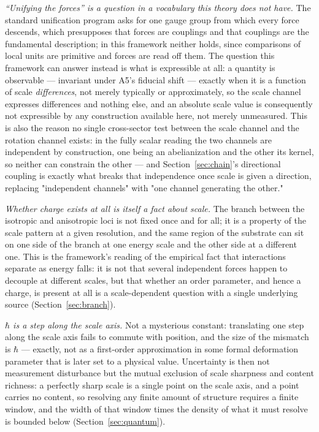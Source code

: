 \documentclass[aps,prd,twocolumn,superscriptaddress,nofootinbib]{revtex4-2}
\begin{document}
\emph{``Unifying the forces'' is a question in a vocabulary this theory
does not have.} The standard unification program asks for one gauge
group from which every force descends, which presupposes that forces
are couplings and that couplings are the fundamental description; in
this framework neither holds, since comparisons of local units are
primitive and forces are read off them. The question this framework can
answer instead is what is expressible at all: a quantity is observable —
invariant under A5's fiducial shift — exactly when it is a function of
scale \emph{differences}, not merely typically or approximately, so the
scale channel expresses differences and nothing else, and an absolute
scale value is consequently not expressible by any construction
available here, not merely unmeasured. This is also the reason no
single cross-sector test between the scale channel and the rotation
channel exists: in the fully scalar reading the two channels are
independent by construction, one being an abelianization and the other
its kernel, so neither can constrain the other — and Section~\ref{sec:chain}'s
directional coupling is exactly what breaks that independence once
scale is given a direction, replacing "independent channels" with "one
channel generating the other."

\emph{Whether charge exists at all is itself a fact about scale.} The
branch between the isotropic and anisotropic loci is not fixed once and
for all; it is a property of the scale pattern at a given resolution,
and the same region of the substrate can sit on one side of the branch
at one energy scale and the other side at a different one. This is the
framework's reading of the empirical fact that interactions separate as
energy falls: it is not that several independent forces happen to
decouple at different scales, but that whether an order parameter, and
hence a charge, is present at all is a scale-dependent question with a
single underlying source (Section~\ref{sec:branch}).

\emph{$\hbar$ is a step along the scale axis.} Not a mysterious
constant: translating one step along the scale axis fails to commute
with position, and the size of the mismatch is $\hbar$ — exactly, not as
a first-order approximation in some formal deformation parameter that is
later set to a physical value. Uncertainty is then not measurement
disturbance but the mutual exclusion of scale sharpness and content
richness: a perfectly sharp scale is a single point on the scale axis,
and a point carries no content, so resolving any finite amount of
structure requires a finite window, and the width of that window times
the density of what it must resolve is bounded below
(Section~\ref{sec:quantum}).
\end{document}
